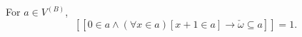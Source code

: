 For $a \in V^{(B)}$,
$$[\![0 \in a \land (\forall x \in a)[x + 1 \in a] \rightarrow \check{\omega} \subseteq a]\!] = 1.$$
